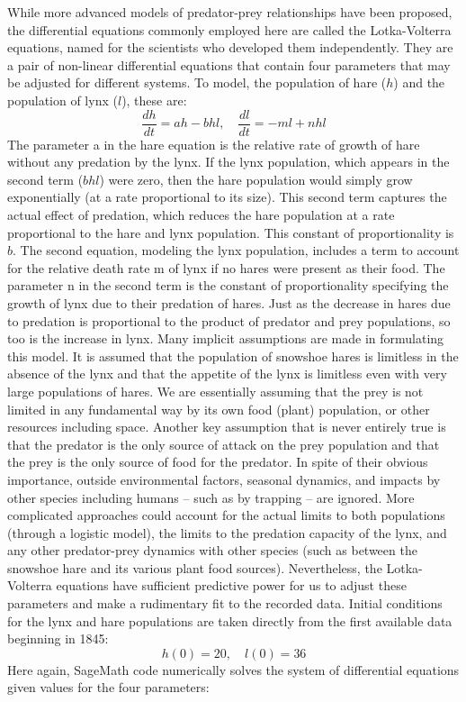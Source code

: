 \documentclass{ximera}
\begin{document}

While more advanced models of predator-prey relationships have been proposed, the differential equations commonly employed here are called the Lotka-Volterra equations, named for the scientists who developed them independently.  They are a pair of non-linear differential equations that contain four parameters that may be adjusted for different systems.  To model, the population of hare ($h$) and the population of lynx ($l$), these are:
$$\frac{dh}{dt}=ah-bhl,\quad\frac{dl}{dt}=-ml+nhl$$
The parameter a in the hare equation is the relative rate of growth of hare without any predation by the lynx.  If the lynx population, which appears in the second term ($bhl$) were zero, then the hare population would simply grow exponentially (at a rate proportional to its size).  This second term captures the actual effect of predation, which reduces the hare population at a rate proportional to the hare and lynx population.  This constant of proportionality is $b$.  The second equation, modeling the lynx population, includes a term to account for the relative death rate m of lynx if no hares were present as their food.  The parameter n in the second term is the constant of proportionality specifying the growth of lynx due to their predation of hares.  Just as the decrease in hares due to predation is proportional to the product of predator and prey populations, so too is the increase in lynx.  Many implicit assumptions are made in formulating this model.  It is assumed that the population of snowshoe hares is limitless in the absence of the lynx and that the appetite of the lynx is limitless even with very large populations of hares.  We are essentially assuming that the prey is not limited in any fundamental way by its own food (plant) population, or other resources including space.  Another key assumption that is never entirely true is that the predator is the only source of attack on the prey population and that the prey is the only source of food for the predator.  In spite of their obvious importance, outside environmental factors, seasonal dynamics, and impacts by other species including humans -- such as by trapping -- are ignored.  More complicated approaches could account for the actual limits to both populations (through a logistic model), the limits to the predation capacity of the lynx, and any other predator-prey dynamics with other species (such as between the snowshoe hare and its various plant food sources).  Nevertheless, the Lotka-Volterra equations have sufficient predictive power for us to adjust these parameters and make a rudimentary fit to the recorded data.
Initial conditions for the lynx and hare populations are taken directly from the first available data beginning in 1845:
$$h(0)=20,\quad l(0)=36$$
Here again, SageMath code numerically solves the system of differential equations given values for the four parameters:
\end{document}
